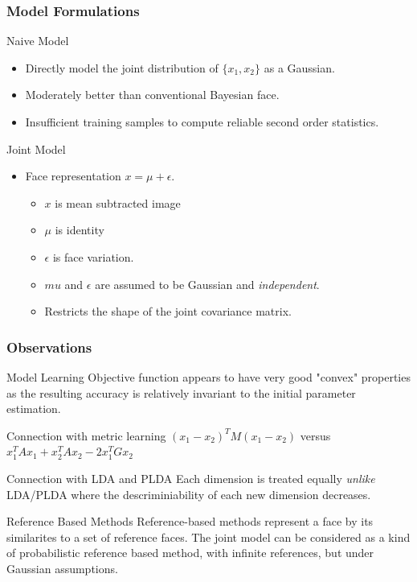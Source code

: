 \documentclass{beamer}
\begin{document}
\begin{frame}
\frametitle{Model Formulations}
\begin{block}{Naive Model}
\begin{itemize}
\item Directly model the joint distribution of $\{x_1,x_2\}$ as a Gaussian.
\pause
\item Moderately better than conventional Bayesian face.
\pause
\item Insufficient training samples to compute reliable second order statistics.
\end{itemize}
\end{block}
\pause
\begin{block}{Joint Model}
\begin{itemize}
\item Face representation $x = \mu + \epsilon$.
\begin{itemize}
\item $x$ is mean subtracted image
\item $\mu$ is identity
\item $\epsilon$ is face variation.
\pause
\item $mu$ and $\epsilon$ are assumed to be Gaussian and \emph{independent}.
\pause
\item Restricts the shape of the joint covariance matrix.
\end{itemize}
\end{itemize}
\end{block}
\end{frame}

\begin{frame}
\frametitle{Observations}
\begin{block}{Model Learning}
Objective function appears to have very good "convex" properties as the resulting accuracy is relatively invariant to the initial parameter estimation.
\end{block}
\pause
\begin{block}{Connection with metric learning}
$(x_1-x_2)^TM(x_1-x_2)$ versus $x_1^TAx_1+x_2^TAx_2-2x_1^TGx_2$
\end{block}
\pause
\begin{block}{Connection with LDA and PLDA}
Each dimension is treated equally \emph{unlike} LDA/PLDA where the descriminiability of each new dimension decreases.
\end{block}
\pause
\begin{block}{Reference Based Methods}
Reference-based methods represent a face by its similarites to a set of reference faces. The joint model can be considered as a kind of probabilistic reference based method, with infinite references, but under Gaussian assumptions.
\end{block}
\end{frame}
\end{document}
